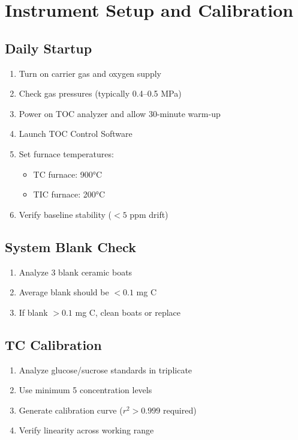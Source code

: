 \documentclass[11pt,a4paper]{article}\usepackage[]{graphicx}\usepackage[]{xcolor}
\begin{document}
\section{Instrument Setup and Calibration}

\subsection{Daily Startup}
\begin{enumerate}[noitemsep]
    \item Turn on carrier gas and oxygen supply
    \item Check gas pressures (typically 0.4--0.5 MPa)
    \item Power on TOC analyzer and allow 30-minute warm-up
    \item Launch TOC Control Software
    \item Set furnace temperatures:
    \begin{itemize}
        \item TC furnace: 900°C
        \item TIC furnace: 200°C
    \end{itemize}
    \item Verify baseline stability ($<5$ ppm drift)
\end{enumerate}

\subsection{System Blank Check}
\begin{enumerate}[noitemsep]
    \item Analyze 3 blank ceramic boats
    \item Average blank should be $<0.1$ mg C
    \item If blank $>0.1$ mg C, clean boats or replace
\end{enumerate}

\subsection{TC Calibration}
\begin{enumerate}[noitemsep]
    \item Analyze glucose/sucrose standards in triplicate
    \item Use minimum 5 concentration levels
    \item Generate calibration curve ($r^2 > 0.999$ required)
    \item Verify linearity across working range
\end{enumerate}
\end{document}
